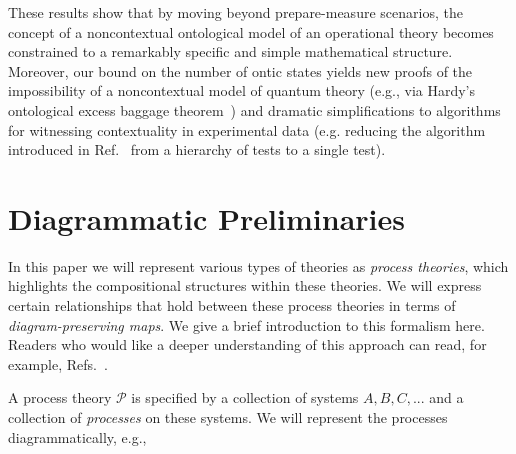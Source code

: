 \documentclass[10pt,twocolumn,aps,groupedaddress,nofootinbib]{revtex4}
\begin{document}
These results show that by moving beyond prepare-measure scenarios, the concept of a noncontextual ontological model of an operational theory becomes constrained to a remarkably specific and simple mathematical structure. Moreover, our bound on the number of ontic states yields new proofs of the impossibility of a noncontextual model of quantum theory (e.g., via Hardy's ontological excess baggage theorem~\cite{Hardy2004}) and dramatic simplifications to algorithms for witnessing contextuality in experimental data (e.g. reducing the algorithm introduced in Ref.~\cite{schmid2019characterization} from a hierarchy of tests to a single test).


\section{Diagrammatic Preliminaries}

In this paper we will represent
various types of theories as \emph{process theories}, which highlights the compositional structures within these theories.
We will express certain relationships that hold between these process theories in terms of \emph{diagram-preserving maps}. We give a brief introduction to this formalism here. Readers who would like a deeper understanding of this approach can read, for example, Refs.~\cite{coecke2017picturing,coecke2015categorical,selbyReconstruction,gogioso2017categorical,schmid2020unscrambling}.

A process theory $\mathcal{P}$ is specified by a collection of systems $A, B, C, ...$ and a collection of \emph{processes} on these systems.
We will represent the processes diagrammatically, e.g.,
\end{document}
